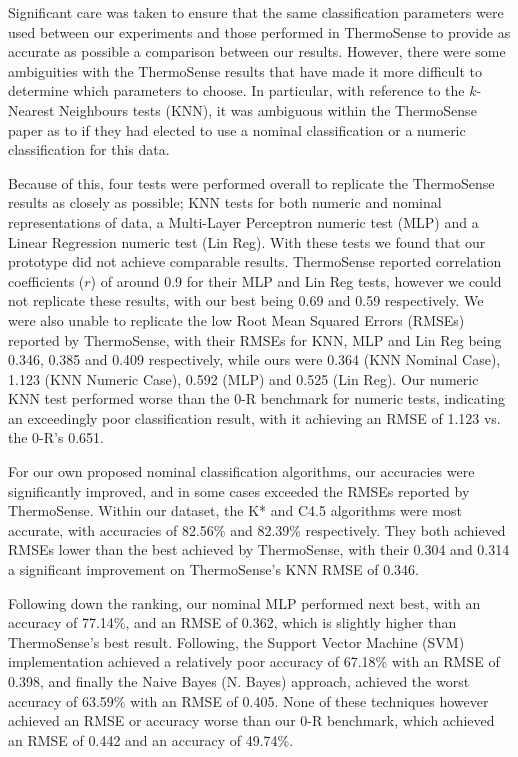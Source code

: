 \documentclass[../thesis/thesis.tex]{subfiles}
\begin{document}
Significant care was taken to ensure that the same classification parameters were used between our experiments and those performed in ThermoSense to provide as accurate as possible a comparison between our results. However, there were some ambiguities with the ThermoSense results that have made it more difficult to determine which parameters to choose. In particular, with reference to the $k$-Nearest Neighbours tests (KNN), it was ambiguous within the ThermoSense paper as to if they had elected to use a nominal classification or a numeric classification for this data.

Because of this, four tests were performed overall to replicate the ThermoSense results as closely as possible; KNN tests for both numeric and nominal representations of data, a Multi-Layer Perceptron numeric test (MLP) and a Linear Regression numeric test (Lin Reg). With these tests we found that our prototype did not achieve comparable results. ThermoSense reported correlation coefficients ($r$) of around 0.9 for their MLP and Lin Reg tests, however we could not replicate these results, with our best being 0.69 and 0.59 respectively. We were also unable to replicate the low Root Mean Squared Errors (RMSEs) reported by ThermoSense, with their RMSEs for KNN, MLP and Lin Reg being 0.346, 0.385 and 0.409 respectively, while ours were 0.364 (KNN Nominal Case), 1.123 (KNN Numeric Case), 0.592 (MLP) and 0.525 (Lin Reg). Our numeric KNN test performed worse than the 0-R benchmark for numeric tests, indicating an exceedingly poor classification result, with it achieving an RMSE of 1.123 vs. the 0-R's 0.651.

For our own proposed nominal classification algorithms, our accuracies were significantly improved, and in some cases exceeded the RMSEs reported by ThermoSense. Within our dataset, the K* and C4.5 algorithms were most accurate, with accuracies of 82.56\% and 82.39\% respectively. They both achieved RMSEs lower than the best achieved by ThermoSense, with their 0.304 and 0.314 a significant improvement on ThermoSense's KNN RMSE of 0.346.

Following down the ranking, our nominal MLP performed next best, with an accuracy of 77.14\%, and an RMSE of 0.362, which is slightly higher than ThermoSense's best result. Following, the Support Vector Machine (SVM) implementation achieved a relatively poor accuracy of 67.18\% with an RMSE of 0.398, and finally the Naive Bayes (N. Bayes) approach, achieved the worst accuracy of 63.59\% with an RMSE of 0.405. None of these techniques however achieved an RMSE or accuracy worse than our 0-R benchmark, which achieved an RMSE of 0.442 and an accuracy of 49.74\%.
\end{document}
